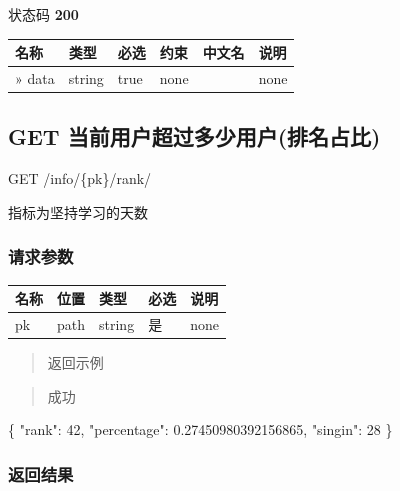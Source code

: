 \documentclass[
]{article}
\newenvironment{Shaded}{}{}
\newcommand{\DataTypeTok}[1]{\textcolor[rgb]{0.56,0.13,0.00}{#1}}
\newcommand{\DecValTok}[1]{\textcolor[rgb]{0.25,0.63,0.44}{#1}}
\newcommand{\FloatTok}[1]{\textcolor[rgb]{0.25,0.63,0.44}{#1}}
\newcommand{\FunctionTok}[1]{\textcolor[rgb]{0.02,0.16,0.49}{#1}}
\begin{document}
状态码 \textbf{200}

\begin{longtable}[]{@{}llllll@{}}
\toprule
名称 & 类型 & 必选 & 约束 & 中文名 & 说明 \\
\midrule
\endhead
» data & string & true & none & & none \\
\bottomrule
\end{longtable}

\hypertarget{get-ux5f53ux524dux7528ux6237ux8d85ux8fc7ux591aux5c11ux7528ux6237ux6392ux540dux5360ux6bd4}{%
\subsection{GET
当前用户超过多少用户(排名占比)}\label{get-ux5f53ux524dux7528ux6237ux8d85ux8fc7ux591aux5c11ux7528ux6237ux6392ux540dux5360ux6bd4}}

GET /info/\{pk\}/rank/

指标为坚持学习的天数

\hypertarget{ux8bf7ux6c42ux53c2ux6570-39}{%
\subsubsection{请求参数}\label{ux8bf7ux6c42ux53c2ux6570-39}}

\begin{longtable}[]{@{}lllll@{}}
\toprule
名称 & 位置 & 类型 & 必选 & 说明 \\
\midrule
\endhead
pk & path & string & 是 & none \\
\bottomrule
\end{longtable}

\begin{quote}
返回示例
\end{quote}

\begin{quote}
成功
\end{quote}

\begin{Shaded}
\begin{Highlighting}[]
\FunctionTok{\{}
  \DataTypeTok{"rank"}\FunctionTok{:} \DecValTok{42}\FunctionTok{,}
  \DataTypeTok{"percentage"}\FunctionTok{:} \FloatTok{0.27450980392156865}\FunctionTok{,}
  \DataTypeTok{"singin"}\FunctionTok{:} \DecValTok{28}
\FunctionTok{\}}
\end{Highlighting}
\end{Shaded}

\hypertarget{ux8fd4ux56deux7ed3ux679c-41}{%
\subsubsection{返回结果}\label{ux8fd4ux56deux7ed3ux679c-41}}
\end{document}
